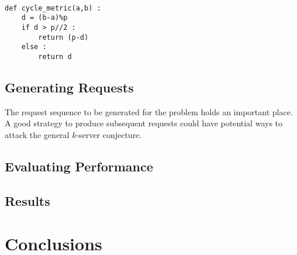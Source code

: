 \lstset{language=Python}          %

\begin{lstlisting}[caption=Code for distance function of a cycle with $p$ points , frame=single]  % Start your code-block

def cycle_metric(a,b) :
	d = (b-a)%p
	if d > p//2 :
		return (p-d)	
	else :
		return d
\end{lstlisting}



\section{Generating Requests}\label{sec:generating-requests}

The request sequence to be generated for the problem holds an important place. A good strategy to produce subsequent requests could have potential ways to attack the general $k$-server conjecture.

\section{Evaluating Performance}\label{sec:evaluating performance}

\section{Results}\label{sec:results}


\chapter{Conclusions}\label{ch:conclusions}